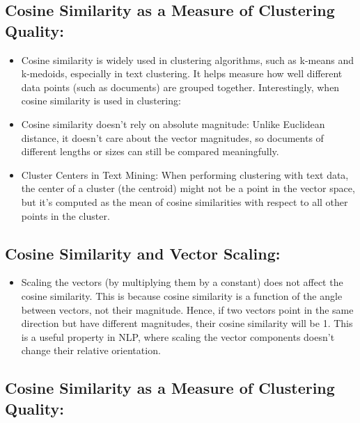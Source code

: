 \documentclass[
  12 pt,
  a4paper,
]{book}
\providecommand{\tightlist}{%
  \setlength{\itemsep}{0pt}\setlength{\parskip}{0pt}}
\numberwithin{equation}{section}
\theoremstyle{plain}      %
\theoremstyle{definition} %
\theoremstyle{remark}     %
\theoremstyle{note}         %
\begin{document}
\hypertarget{cosine-similarity-as-a-measure-of-clustering-quality}{%
\subsection{Cosine Similarity as a Measure of Clustering
Quality:}\label{cosine-similarity-as-a-measure-of-clustering-quality}}

\begin{itemize}
\tightlist
\item
  Cosine similarity is widely used in clustering algorithms, such as
  k-means and k-medoids, especially in text clustering. It helps measure
  how well different data points (such as documents) are grouped
  together. Interestingly, when cosine similarity is used in clustering:
\item
  Cosine similarity doesn't rely on absolute magnitude: Unlike Euclidean
  distance, it doesn't care about the vector magnitudes, so documents of
  different lengths or sizes can still be compared meaningfully.
\item
  Cluster Centers in Text Mining: When performing clustering with text
  data, the center of a cluster (the centroid) might not be a point in
  the vector space, but it's computed as the mean of cosine similarities
  with respect to all other points in the cluster.
\end{itemize}

\hypertarget{cosine-similarity-and-vector-scaling}{%
\subsection{Cosine Similarity and Vector
Scaling:}\label{cosine-similarity-and-vector-scaling}}

\begin{itemize}
\tightlist
\item
  Scaling the vectors (by multiplying them by a constant) does not
  affect the cosine similarity. This is because cosine similarity is a
  function of the angle between vectors, not their magnitude. Hence, if
  two vectors point in the same direction but have different magnitudes,
  their cosine similarity will be 1. This is a useful property in NLP,
  where scaling the vector components doesn't change their relative
  orientation.
\end{itemize}

\hypertarget{cosine-similarity-as-a-measure-of-clustering-quality-1}{%
\subsection{Cosine Similarity as a Measure of Clustering
Quality:}\label{cosine-similarity-as-a-measure-of-clustering-quality-1}}
\end{document}
